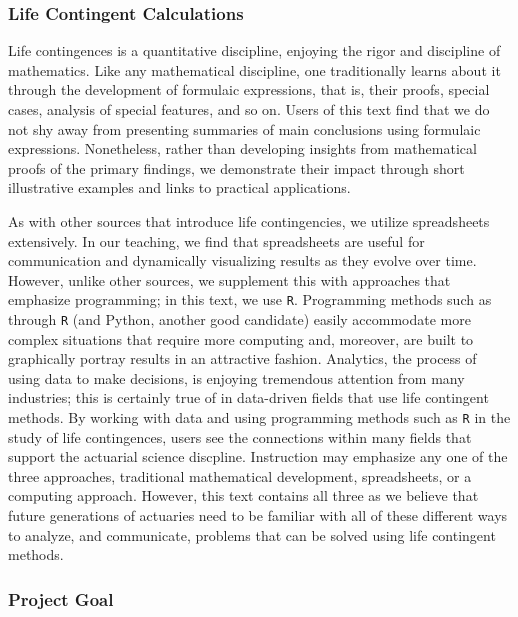 \documentclass[
]{book}
\begin{document}
\hypertarget{life-contingent-calculations}{%
\subsubsection*{Life Contingent Calculations}\label{life-contingent-calculations}}

Life contingences is a quantitative discipline, enjoying the rigor and discipline of mathematics. Like any mathematical discipline, one traditionally learns about it through the development of formulaic expressions, that is, their proofs, special cases, analysis of special features, and so on. Users of this text find that we do not shy away from presenting summaries of main conclusions using formulaic expressions. Nonetheless, rather than developing insights from mathematical proofs of the primary findings, we demonstrate their impact through short illustrative examples and links to practical applications.

As with other sources that introduce life contingencies, we utilize spreadsheets extensively. In our teaching, we find that spreadsheets are useful for communication and dynamically visualizing results as they evolve over time. However, unlike other sources, we supplement this with approaches that emphasize programming; in this text, we use \texttt{R}. Programming methods such as through \texttt{R} (and Python, another good candidate) easily accommodate more complex situations that require more computing and, moreover, are built to graphically portray results in an attractive fashion. Analytics, the process of using data to make decisions, is enjoying tremendous attention from many industries; this is certainly true of in data-driven fields that use life contingent methods. By working with data and using programming methods such as \texttt{R} in the study of life contingences, users see the connections within many fields that support the actuarial science discpline. Instruction may emphasize any one of the three approaches, traditional mathematical development, spreadsheets, or a computing approach. However, this text contains all three as we believe that future generations of actuaries need to be familiar with all of these different ways to analyze, and communicate, problems that can be solved using life contingent methods.

\hypertarget{project-goal}{%
\subsubsection*{Project Goal}\label{project-goal}}
\end{document}
